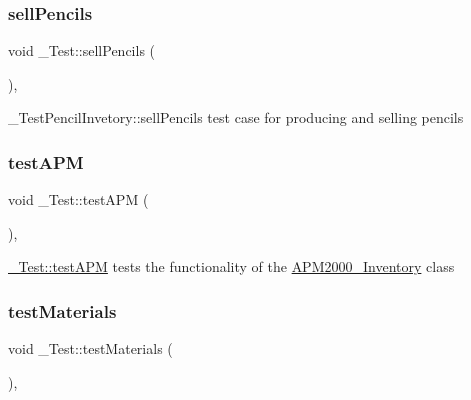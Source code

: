 \mbox{\label{class__Test_a92dbc86899cfc80c08981ddcace05b5e}} 
\subsubsection{\texorpdfstring{sell\+Pencils}{sellPencils}}
{\footnotesize\ttfamily void \+\_\+\+Test\+::sell\+Pencils (\begin{DoxyParamCaption}{ }\end{DoxyParamCaption})\hspace{0.3cm}{\ttfamily [private]}, {\ttfamily [slot]}}



\+\_\+\+Test\+Pencil\+Invetory\+::sell\+Pencils test case for producing and selling pencils 

\mbox{\label{class__Test_adb7f71ea12e1b02afd6b4d1f7d65c1eb}} 
\subsubsection{\texorpdfstring{test\+A\+PM}{testAPM}}
{\footnotesize\ttfamily void \+\_\+\+Test\+::test\+A\+PM (\begin{DoxyParamCaption}{ }\end{DoxyParamCaption})\hspace{0.3cm}{\ttfamily [private]}, {\ttfamily [slot]}}



\hyperlink{class__Test_adb7f71ea12e1b02afd6b4d1f7d65c1eb}{\+\_\+\+Test\+::test\+A\+PM} tests the functionality of the \hyperlink{classAPM2000__Inventory}{A\+P\+M2000\+\_\+\+Inventory} class 

\mbox{\label{class__Test_ad5396e54792008660924db2e16edb614}} 
\subsubsection{\texorpdfstring{test\+Materials}{testMaterials}}
{\footnotesize\ttfamily void \+\_\+\+Test\+::test\+Materials (\begin{DoxyParamCaption}{ }\end{DoxyParamCaption})\hspace{0.3cm}{\ttfamily [private]}, {\ttfamily [slot]}}



